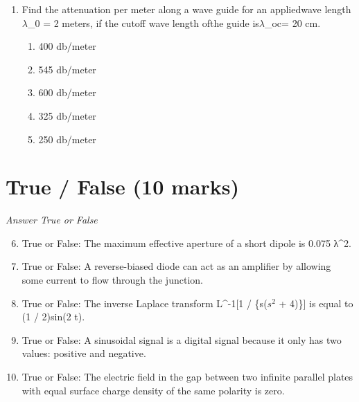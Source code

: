 \documentclass[12pt]{article}
\begin{document}
\begin{enumerate}[label=\arabic*.]
\begin{enumerate}[label=(\alph*)]
    \item \{$Q^2$ / (16\ensuremath{\pi}\ensuremath{\epsilon}\_0 R)\}
    \item \{2 $Q^2$ / (8\ensuremath{\pi}\ensuremath{\epsilon}\_0 R)\}
    \item \{Q / (8\ensuremath{\pi}\ensuremath{\epsilon}\_0 R)\}
    \item \{Q / (16\ensuremath{\pi}\ensuremath{\epsilon}\_0 $R^2$)\}
    \item \{Q / (4\ensuremath{\pi}\ensuremath{\epsilon}\_0 $R^2$)\}
\end{enumerate}
\item Find the attenuation per meter along a wave guide for an appliedwave length \ensuremath{\lambda}\_0 = 2 meters, if the cutoff wave length ofthe guide is\ensuremath{\lambda}\_oc= 20 cm.
\begin{enumerate}[label=(\alph*)]
    \item 400 db/meter
    \item 545 db/meter
    \item 600 db/meter
    \item 325 db/meter
    \item 250 db/meter
\end{enumerate}
\end{enumerate}

\section*{True / False (10 marks)}
\textit{Answer True or False}
\begin{enumerate}[label=\arabic*.]
\setcounter{enumi}{5}
\item True or False: The maximum effective aperture of a short dipole is 0.075 λ^2.
\item True or False: A reverse-biased diode can act as an amplifier by allowing some current to flow through the junction.
\item True or False: The inverse Laplace transform L^-1[1 / \{s($s^2$ + 4)\}] is equal to (1 / 2)sin(2 t).
\item True or False: A sinusoidal signal is a digital signal because it only has two values: positive and negative.
\item True or False: The electric field in the gap between two infinite parallel plates with equal surface charge density of the same polarity is zero.
\end{enumerate}
\end{document}
